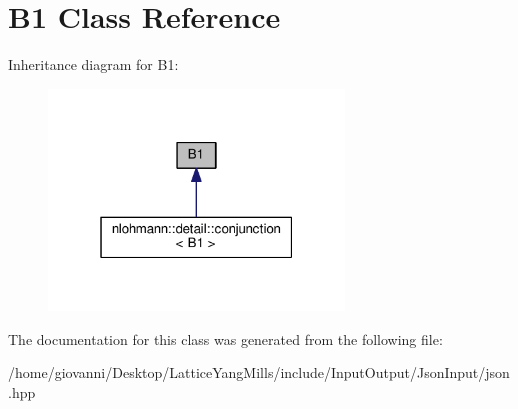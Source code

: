 \hypertarget{classB1}{}\section{B1 Class Reference}
\label{classB1}


Inheritance diagram for B1\+:\nopagebreak
\begin{figure}[H]
\begin{center}
\leavevmode
\includegraphics[width=223pt]{classB1__inherit__graph}
\end{center}
\end{figure}


The documentation for this class was generated from the following file\+:\begin{DoxyCompactItemize}
\item 
/home/giovanni/\+Desktop/\+Lattice\+Yang\+Mills/include/\+Input\+Output/\+Json\+Input/json.\+hpp\end{DoxyCompactItemize}
